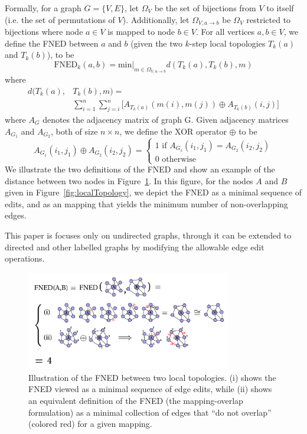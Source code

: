 \documentclass{article}
\begin{document}
Formally, for a graph $G = \{V,E\}$, let $\Omega_{V}$ be the set of bijections from $V$ to itself (i.e. the set of permutations of $V$). Additionally, let $\Omega_{V, a\rightarrow b}$ be $\Omega_{V}$ restricted to bijections where node $a\in V$ is mapped to node $b\in V$. For all vertices $a,b \in V$, we define the FNED between $a$ and $b$ (given the two $k$-step local topologies $T_{k}(a)$ and $T_{k}(b)$), to be
\begin{equation}
\text{FNED}_{k}(a,b) = \text{min} \big|_{m \in \Omega_{V, a\rightarrow b}} d(T_{k}(a), T_{k}(b), m)
\end{equation}
where
\begin{equation}
\begin{split}
d(T_{k}(a), & T_{k}(b), m) = \\ 
& \sum_{i=1}^{n} \sum_{j=i}^{n} \Big[ A_{T_{k}(a)}(m(i),m(j)) \oplus A_{T_{k}(b)}(i,j)  \Big]
\end{split}
\end{equation}
where $A_{G}$ denotes the adjacency matrix of graph G. Given adjacency matrices $A_{G_{1}}$ and $A_{G_{2}}$, both of size $n \times n$, we define the XOR operator $\oplus$ to be
\begin{equation}
A_{G_{1}}(i_{1},j_{1}) \oplus A_{G_{2}}(i_{2},j_{2}) = 
\begin{cases}
1 \text{ if } A_{G_{1}}(i_{1},j_{1}) = A_{G_{2}}(i_{2},j_{2}) \\ 
0 \text{ otherwise}
\end{cases}
\end{equation}
We illustrate the two definitions of the FNED and show an example of the distance between two nodes in Figure~\ref{fig:fnedFigure}. In this figure, for the nodes $A$ and $B$ given in Figure~\ref{fig:localTopology}, we depict the FNED as a minimal sequence of edits, and as an mapping that yields the minimum number of non-overlapping edges.

This paper is focuses only on undirected graphs, through it can be extended to directed and other labelled graphs by modifying the allowable edge edit operations.

\begin{figure}[h!tbp]
  \centering               
  \includegraphics[width=0.8\textwidth]{fig/fig2.pdf}
  \caption{Illustration of the FNED between two local topologies. (i) shows the FNED viewed as a minimal sequence of edge edits, while (ii) shows an equivalent definition of the FNED (the mapping-overlap formulation) as a minimal collection of edges that ``do not overlap'' (colored red) for a given mapping.}
  \label{fig:fnedFigure}
\end{figure}
\end{document}
